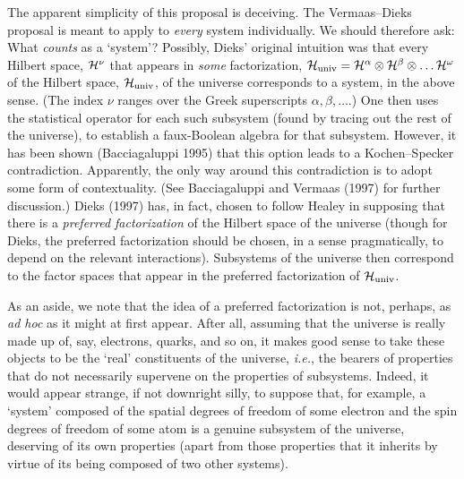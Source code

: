 \documentclass[12pt]{article}
\newcommand{\ie}{{\it i.e.}}         %
\newcommand{\cH}{\cal{H}}                                       %
\newcommand{\ga}{\alpha}                                        %
\newcommand{\gb}{\beta}                                         %
\newcommand{\gn}{\nu}                                           %
\newcommand{\gw}{\omega}                                        %
\begin{document}
The apparent simplicity of this proposal is deceiving.  The
Vermaas--Dieks proposal is meant to apply to {\it every} system
individually.  We should therefore ask: What {\it counts} as a
`system'?  Possibly, Dieks' original intuition was that every Hilbert space,
${\cH}^{\gn}$ that appears in {\it some} factorization,
$\cH_{\mbox{{\scriptsize univ}}} = \cH^{\ga} \otimes
\cH^{\gb} \otimes \ldots \cH^{\gw}$ of the Hilbert space,
$\cH_{\mbox{{\scriptsize univ}}}$, of the universe corresponds to a 
system, in the above sense.  (The index $\gn$ ranges over the Greek 
superscripts $\ga, \gb, \ldots$.) One then uses the statistical 
operator for each such subsystem (found by tracing out the rest of the 
universe), to establish a faux-Boolean algebra for that subsystem.  
However, it has been shown (Bacciagaluppi 1995) that this option leads 
to a Kochen--Specker contradiction.  Apparently, the only way around 
this contradiction is to adopt some form of contextuality.  (See 
Bacciagaluppi and Vermaas (1997) for further discussion.) Dieks (1997) 
has, in fact, chosen to follow Healey in supposing that there is a 
{\it preferred factorization} of the Hilbert space of the universe 
(though for Dieks, the preferred factorization should be chosen, in a 
sense pragmatically, to depend on the relevant interactions).  
Subsystems of the universe then correspond to the factor spaces that 
appear in the preferred factorization of $\cH_{\mbox{{\scriptsize 
univ}}}$.

As an aside, we note that the idea of a preferred factorization is
not, perhaps, as {\it ad hoc} as it might at first appear.  After all,
assuming that the universe is really made up of, say, electrons,
quarks, and so on, it makes good sense to take these objects to be the
`real' constituents of the universe, \ie, the bearers of properties
that do not necessarily supervene on the properties of subsystems.
Indeed, it would appear strange, if not downright silly, to
suppose that, for example, a `system' composed of the spatial degrees
of freedom of some electron and the spin degrees of freedom of some
atom is a genuine subsystem of the universe, deserving of its own
properties (apart from those properties that it inherits by virtue of
its being composed of two other systems).
\end{document}
